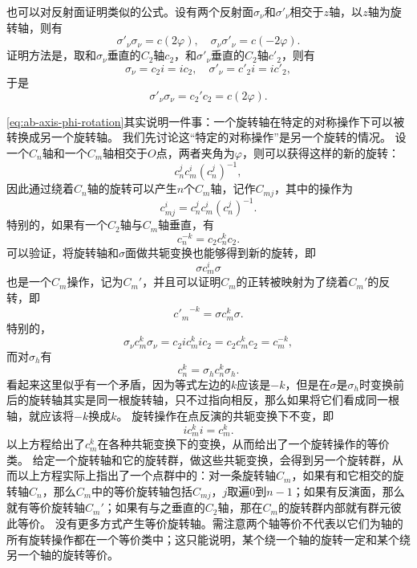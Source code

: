 也可以对反射面证明类似的公式。设有两个反射面$\sigma_{\nu}$和$\sigma'_\nu$相交于$z$轴，以$z$轴为旋转轴，则有
\begin{equation}
    \sigma'_\nu \sigma_\nu = c(2\varphi), \quad \sigma_\nu \sigma'_\nu = c(-2\varphi).
\end{equation}
证明方法是，取和$\sigma_{\nu}$垂直的$C_2$轴$c_2$，和$\sigma'_\nu$垂直的$C_2$轴$c'_2$，则有
\[
    \sigma_\nu = c_2 i = i c_2, \quad \sigma'_\nu = c'_2 i = i c'_2,
\]
于是
\[
    \sigma'_\nu \sigma_\nu = c_2' c_2 = c(2\varphi).
\]

\eqref{eq:ab-axis-phi-rotation}其实说明一件事：一个旋转轴在特定的对称操作下可以被转换成另一个旋转轴。
我们先讨论这“特定的对称操作”是另一个旋转的情况。
设一个$C_n$轴和一个$C_m$轴相交于$O$点，两者夹角为$\varphi$，则可以获得这样的新的旋转：
\[
    c_n^j c_m^i (c_n^j)^{-1},
\]
因此通过绕着$C_n$轴的旋转可以产生$n$个$C_m$轴，记作$C_{m j}$，其中的操作为
\begin{equation}
    c_{m j}^i = c_n^j c_m^i (c_n^j)^{-1}.
    \label{eq:from-one-axis-to-another}
\end{equation}
特别的，如果有一个$C_2$轴与$C_m$轴垂直，有
\begin{equation}
    c_n^{-k} = c_2 c_n^k c_2.
    \label{eq:inverse-k-c2}
\end{equation}
可以验证，将旋转轴和$\sigma$面做共轭变换也能够得到新的旋转，即
\[
    \sigma c_m^i \sigma
\]
也是一个$C_m$操作，记为$C_m'$，并且可以证明$C_m$的正转被映射为了绕着$C_m'$的反转，即
\begin{equation}
    {c'_{m}}^{-k} = \sigma c_m^k \sigma.
\end{equation}
特别的，
\begin{equation}
    \sigma_\nu c_m^k \sigma_\nu = c_2 i c_m^k i c_2 = c_2 c_m^k c_2 = c_m^{-k},
\end{equation}
而对$\sigma_h$有
\begin{equation}
    c_n^k = \sigma_h c_n^k \sigma_h.
    \label{eq:perpendicular-sigma-c}
\end{equation}
看起来这里似乎有一个矛盾，因为等式左边的$k$应该是$-k$，但是在$\sigma$是$\sigma_h$时变换前后的旋转轴其实是同一根旋转轴，只不过指向相反，那么如果将它们看成同一根轴，就应该将$-k$换成$k$。
旋转操作在点反演的共轭变换下不变，即
\begin{equation}
    i c_m^k i = c_m^k.
\end{equation}
以上方程给出了$c_m^k$在各种共轭变换下的变换，从而给出了一个旋转操作的等价类。
给定一个旋转轴和它的旋转群，做这些共轭变换，会得到另一个旋转群，从而以上方程实际上指出了一个点群中的：对一条旋转轴$C_m$，如果有和它相交的旋转轴$C_n$，那么$C_m$中的等价旋转轴包括$C_{mj}$，$j$取遍$0$到$n-1$；如果有反演面，那么就有等价旋转轴$C_m'$；如果有与之垂直的$C_2$轴，那在$C_m$的旋转群内部就有群元彼此等价。
没有更多方式产生等价旋转轴。需注意两个轴等价不代表以它们为轴的所有旋转操作都在一个等价类中；这只能说明，某个绕一个轴的旋转一定和某个绕另一个轴的旋转等价。


